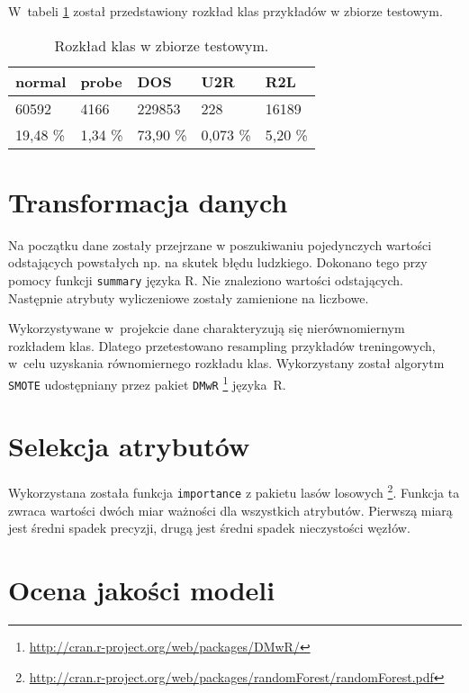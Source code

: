 \documentclass[a4paper, 12pt]{article}
\begin{document}
W~tabeli \ref{table:test} został przedstawiony rozkład klas przykładów w zbiorze testowym.
\begin{table}[htb]
\begin{center}
	\caption{Rozkład klas w zbiorze testowym.}
	\label{table:test}
	\begin{tabular}{ | l | l | l | l | l | } \hline
		normal & probe & DOS & U2R & R2L \\ \hline
		60592 & 4166 & 229853 & 228 & 16189 \\ \hline
		19,48 \% & 1,34 \% & 73,90 \% & 0,073 \%  & 5,20 \% \\ \hline
	\end{tabular}
\end{center}
\end{table}

\section{Transformacja danych}

Na początku dane zostały przejrzane w poszukiwaniu pojedynczych wartości odstających
powstałych np. na skutek błędu ludzkiego. Dokonano tego przy pomocy funkcji \texttt{summary}
języka R. Nie znaleziono wartości odstających. 
Następnie atrybuty wyliczeniowe zostały zamienione na liczbowe.

Wykorzystywane w~projekcie dane charakteryzują się nierównomiernym rozkładem klas. 
Dlatego przetestowano resampling przykładów treningowych, w~celu uzyskania równomiernego rozkładu klas. 
Wykorzystany został algorytm \texttt{SMOTE} udostępniany przez pakiet 
\texttt{DMwR} \footnote{\url{http://cran.r-project.org/web/packages/DMwR/}} języka~R.

\section{Selekcja atrybutów}
\label{sec:selekcja}

Wykorzystana została funkcja \texttt{importance} z pakietu lasów losowych
\footnote{\url{http://cran.r-project.org/web/packages/randomForest/randomForest.pdf}}.
Funkcja ta zwraca wartości dwóch miar ważności dla wszystkich atrybutów.
Pierwszą miarą jest średni spadek precyzji, drugą jest średni spadek nieczystości węzłów.


\section{Ocena jakości modeli}
\end{document}
